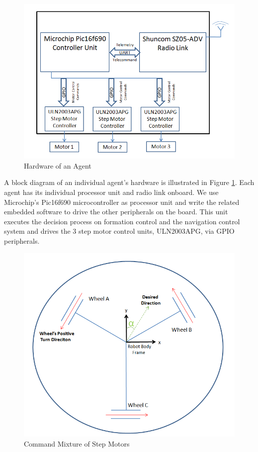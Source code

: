		

		
\begin{figure}[H]
\caption{Hardware of an Agent} \label{indhardware_ref}
\centerline{\includegraphics[scale = 0.65]{agent}}
\end{figure} 
		
A block diagram of an individual agent's hardware is illustrated in Figure \ref{indhardware_ref}. Each agent has its individual processor unit and radio link onboard. We use Microchip's Pic16f690 microcontroller as processor unit and write the related embedded software to drive the other peripherals on the board. This unit executes the decision process on formation control and the navigation control system and drives the 3 step motor control units, ULN2003APG, via GPIO peripherals.
		
\begin{figure}[H]
\caption{Command Mixture of Step Motors} \label{ccmb_ref}
\centerline{\includegraphics[scale = 0.65]{ccmb}}
\end{figure} 


